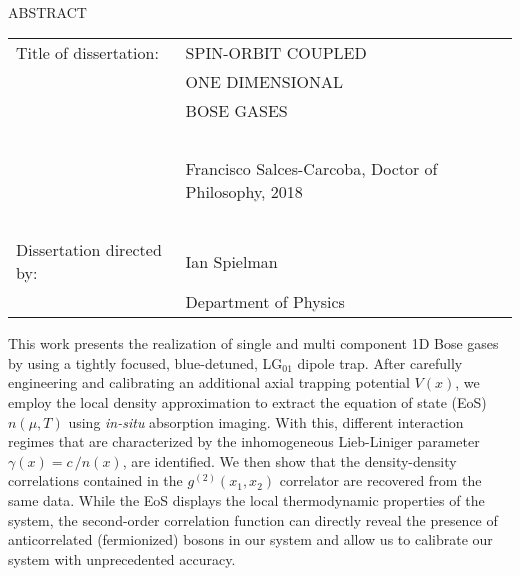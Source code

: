 
\hbox{\ }

\renewcommand{\baselinestretch}{1}
\small \normalsize

\begin{center}
\large{{ABSTRACT}} 

\vspace{3em} 

\end{center}
\hspace{-.15in}
\begin{tabular}{ll}
Title of dissertation:    & {\large  SPIN-ORBIT COUPLED}\\
&				      {\large   ONE DIMENSIONAL} \\
&				      {\large  BOSE GASES} \\
\ \\
&                          {\large  Francisco Salces-Carcoba, Doctor of Philosophy, 2018} \\
\ \\
Dissertation directed by: & {\large  Ian Spielman} \\
&  				{\large	 Department of Physics } \\
\end{tabular}

\vspace{3em}

\renewcommand{\baselinestretch}{2}
\large \normalsize

This work presents the realization of single and multi component 1D Bose gases by using a tightly focused, blue-detuned, LG$_{01}$ dipole trap. After carefully engineering and calibrating an additional axial trapping potential $ V(x) $, we employ the local density approximation to extract the equation of state (EoS)  $n(\mu, T)$ using \textit{in-situ} absorption imaging. With this, different interaction regimes that are characterized by the inhomogeneous Lieb-Liniger parameter $\gamma(x) = c \,/n(x)$, are identified. We then show that the density-density correlations contained in the $g^{(2)}(x_{1}, x_{2})$ correlator are recovered from the same data. While the EoS displays the local thermodynamic properties of the system, the second-order correlation function can directly reveal the presence of anticorrelated (fermionized) bosons in our system and allow us to calibrate our system with unprecedented accuracy.


